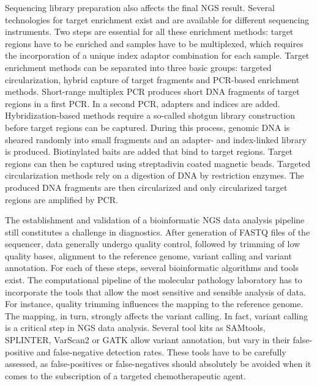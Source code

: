 {{      Sequencing library preparation also affects the final NGS result. Several
      technologies for target enrichment exist and are available for different
      sequencing instruments. Two steps are essential for all these enrichment
      methods: target regions have to be enriched and samples have to be
      multiplexed, which requires the incorporation of a unique index adaptor
      combination for each sample. Target enrichment methods can be separated
      into three basic groups: targeted circularization, hybrid capture of
      target fragments and PCR-based enrichment methods. Short-range multiplex
      PCR produces short DNA fragments of target regions in a first PCR. In a
      second PCR, adapters and indices are added. Hybridization-based methods
      require a so-called shotgun library construction before target regions can
      be captured. During this process, genomic DNA is sheared randomly into
      small fragments and an adapter- and index-linked library is produced.
      Biotinylated baits are added that bind to target regions. Target regions
      can then be captured using streptadivin coated magnetic beads. Targeted
      circularization methods rely on a digestion of DNA by restriction enzymes.
      The produced DNA fragments are then circularized and only circularized
      target regions are amplified by PCR.

      The establishment and validation of a bioinformatic NGS data analysis
      pipeline still constitutes a challenge in diagnostics. After generation of
      FASTQ files of the sequencer, data generally undergo quality control,
      followed by trimming of low quality bases, alignment to the reference
      genome, variant calling and variant annotation. For each of these steps,
      several bioinformatic algorithms and tools exist. The computational
      pipeline of the molecular pathology laboratory has to incorporate the
      tools that allow the most sensitive and sensible analysis of data. For
      instance, quality trimming influences the mapping to the reference genome.
      The mapping, in turn, strongly affects the variant calling. In fact,
      variant calling is a critical step in NGS data analysis. Several tool kits
      as SAMtools, SPLINTER, VarScan2 or GATK allow variant annotation, but vary
      in their false-positive and false-negative detection rates.
      These tools have to be carefully assessed, as false-positives or
      false-negatives should absolutely be avoided when it comes to the
      subscription of a targeted chemotherapeutic agent.

}}
